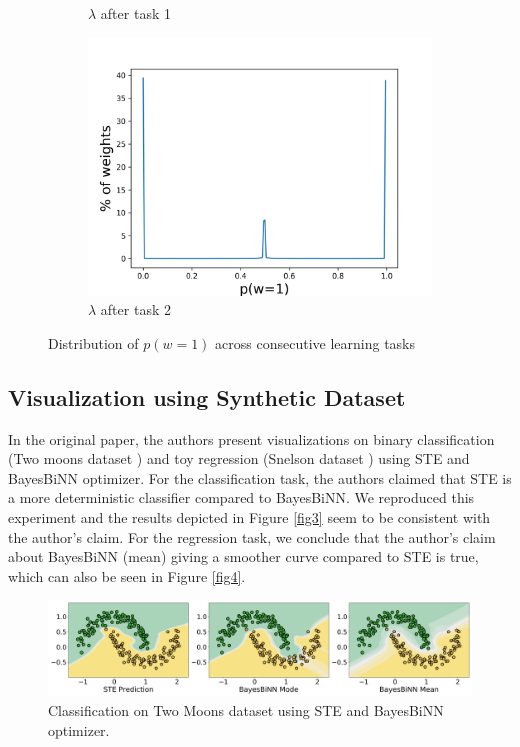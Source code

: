 \begin{figure}[h]
\begin{subfigure}[b]{0.3\textwidth}
         \caption{$\lambda$ after task 1}
     \end{subfigure}
     \hfill
     \begin{subfigure}[b]{0.3\textwidth}
         \centering
         \includegraphics[width=1.1\textwidth]{../openreview/figs/after_task_2.png}
         \caption{$\lambda$ after task 2}
     \end{subfigure}
        \caption{Distribution of $p(w=1)$ across consecutive learning tasks}
\end{figure}

\subsection{Visualization using Synthetic Dataset}

In the original paper, the authors present visualizations on binary classification (Two moons dataset \citet{r10}) and toy regression (Snelson dataset \citet{r9}) using STE and BayesBiNN optimizer. For the classification task, the authors claimed that STE is a more deterministic classifier compared to BayesBiNN. We reproduced this experiment and the results depicted in Figure \autoref{fig3} seem to be consistent with the author's claim. For the regression task, we conclude that the author's claim about BayesBiNN (mean) giving a smoother curve compared to STE is true, which can also be seen in Figure \autoref{fig4}. 


\begin{figure}[h]
     \centering
         \includegraphics[width=1\textwidth]{../openreview/figs/TwoMoon.png}
         \caption{Classification on Two Moons dataset using STE and BayesBiNN optimizer.}
         \label{fig3}
\end{figure}

